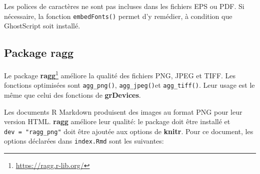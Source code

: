 \documentclass[
  12pt,
  french,
  a4paper,
  extrafontsizes,onecolumn,openright
  ]{memoir}
\newenvironment{Shaded}{\begin{snugshade}}{\end{snugshade}}
\newcommand{\AttributeTok}[1]{\textcolor[rgb]{0.13,0.29,0.53}{#1}}
\newcommand{\CommentTok}[1]{\textcolor[rgb]{0.56,0.35,0.01}{\textit{#1}}}
\newcommand{\ConstantTok}[1]{\textcolor[rgb]{0.56,0.35,0.01}{#1}}
\newcommand{\DecValTok}[1]{\textcolor[rgb]{0.00,0.00,0.81}{#1}}
\newcommand{\FunctionTok}[1]{\textcolor[rgb]{0.13,0.29,0.53}{\textbf{#1}}}
\newcommand{\NormalTok}[1]{#1}
\newcommand{\SpecialCharTok}[1]{\textcolor[rgb]{0.81,0.36,0.00}{\textbf{#1}}}
\newcommand{\StringTok}[1]{\textcolor[rgb]{0.31,0.60,0.02}{#1}}
\begin{document}
Les polices de caractères ne sont pas incluses dans les fichiers EPS ou PDF.
Si nécessaire, la fonction \texttt{embedFonts()} permet d'y remédier, à condition que GhostScript soit installé.

\subsection{Package ragg}\label{package-ragg}

Le package \textbf{ragg}\footnote{\url{https://ragg.r-lib.org/}} améliore la qualité des fichiers PNG, JPEG et TIFF.
Les fonctions optimisées sont \texttt{agg\_png()}, \texttt{agg\_jpeg()}et \texttt{agg\_tiff()}. Leur usage est le même que celui des fonctions de \textbf{grDevices}.

Les documents R Markdown produisent des images au format PNG pour leur version HTML.
\textbf{ragg} améliore leur qualité: le package doit être installé et \texttt{dev\ =\ "ragg\_png"} doit être ajoutée aux options de \textbf{knitr}.
Pour ce document, les options déclarées dans \texttt{index.Rmd} sont les suivantes:

\scriptsize

\begin{Shaded}
\end{Shaded}
\end{document}
